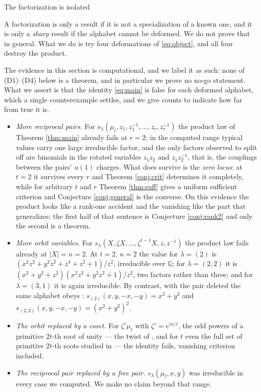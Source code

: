 \documentclass[11pt,reqno]{amsart}
\makeatletter
\renewcommand\section{\@startsection{section}{1}%
  \z@{\linespacing\@plus\linespacing}{.5\linespacing}%
  {\normalfont\large\bfseries\centering}}
\theoremstyle{plain}
\theoremstyle{definition}
\newcommand{\zt}{\mu_t}
\makeatother
\begin{document}
\section{The factorization is isolated}\label{sec:sharp}

A factorization is only a result if it is not a specialization of a known one, and it is only a
\emph{sharp} result if the alphabet cannot be deformed. We do not prove that in general. What we do
is try four deformations of \eqref{eq:object}, and all four destroy the product.

The evidence in this section is computational, and we label it as such: none of (D1)--(D4) below is
a theorem, and in particular we prove no no-go statement. What we assert is that the identity
\eqref{eq:main} is false for each deformed alphabet, which a single counterexample settles, and we
give counts to indicate how far from true it is.

\begin{itemize}
\item[\rm(D1)] \emph{More reciprocal pairs.} For $s_\lambda(\zt,z_1,z_1^{-1},\dots,z_r,z_r^{-1})$
the product law of Theorem \ref{thm:main} already fails at $r=2$: in the computed range typical
values carry one large irreducible factor, and the only factors observed to split off are binomials
in the rotated variables $z_1z_2$ and $z_1z_2^{-1}$, that is,
the couplings between the pairs' $u(1)$ charges. What does survive is the \emph{zero locus}: at
$t=2$ it survives every $r$ and Theorem \ref{conj:crit} determines it completely, while for
arbitrary $t$ and $r$ Theorem \ref{thm:suff} gives a uniform sufficient criterion and Conjecture
\ref{conj:general} is the converse. On this evidence the product looks like a rank-one accident and
the vanishing like the part that generalizes; the first half of that sentence is Conjecture
\ref{conj:rank2} and only the second is a theorem.
\item[\rm(D2)] \emph{More orbit variables.} For $s_\lambda(X,\zeta X,\dots,\zeta^{t-1}X,z,z^{-1})$
the product law fails already at $|X|=n=2$. At $t=2$, $n=2$ the value for $\lambda=(2)$ is
$(x^2z^2+y^2z^2+z^4+z^2+1)/z^2$, irreducible over $\mathbb Q$; for $\lambda=(2,2)$ it is
$(x^2+y^2+z^2)(x^2z^2+y^2z^2+1)/z^2$, two factors rather than three; and for $\lambda=(3,1)$ it is
again irreducible. By contrast, with the pair deleted the same alphabet obeys \cite[Theorem
2.3]{AK25}: $s_{(2)}(x,y,-x,-y)=x^2+y^2$ and $s_{(2,2)}(x,y,-x,-y)=(x^2+y^2)^2$.
\item[\rm(D3)] \emph{The orbit replaced by a coset.} For $\zeta'\zt$ with $\zeta'=e^{\pi i/t}$, the
odd powers of a primitive $2t$-th root of unity --- the twist of \cite[\S3]{AK25}, and for $t$ even
the full set of primitive $2t$-th roots studied in \cite{HI24} --- the identity fails, vanishing
criterion included.
\item[\rm(D4)] \emph{The reciprocal pair replaced by a free pair.} $s_\lambda(\zt,x,y)$ was
irreducible in every case we computed. We make no claim beyond that range.
\end{itemize}
\end{document}
